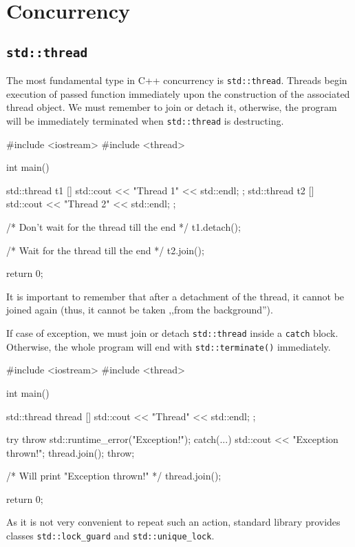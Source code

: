 \documentclass[../main]{subfiles}
\begin{document}
\chapter{Concurrency}
\section{\texttt{std::thread}}
    The most fundamental type in C++ concurrency is \texttt{std::thread}. Threads begin execution of passed function immediately
upon the construction of the associated thread object. We must remember to join or detach it, otherwise, the program
will be immediately terminated when \texttt{std::thread} is destructing.
\begin{Code}
    #include <iostream>
    #include <thread>

    int main()
    {
        std::thread t1 { [] { std::cout << "Thread 1" << std::endl; } };
        std::thread t2 { [] { std::cout << "Thread 2" << std::endl; } };

        /* Don't wait for the thread till the end */
        t1.detach();

        /* Wait for the thread till the end */
        t2.join();

        return 0;
    }
\end{Code}
\noindent
It is important to remember that after a detachment of the thread, it cannot be joined again (thus, it cannot be taken ,,from the background'').\newline

    If case of exception, we must join or detach \texttt{std::thread} inside a \texttt{catch} block. Otherwise, the whole program
will end with \texttt{std::terminate()} immediately.

\begin{Code}
    #include <iostream>
    #include <thread>

    int main()
    {
        std::thread thread { [] { std::cout << "Thread" << std::endl; }};

        try
        {
           throw std::runtime_error("Exception!");
        }
        catch(...)
        {
            std::cout << "Exception thrown!";
            thread.join();
            throw;
        }

        /* Will print "Exception thrown!" */
        thread.join();

        return 0;
    }
\end{Code}
\noindent
As it is not very convenient to repeat such an action, standard
library provides classes \texttt{std::lock\_guard} and
\texttt{std::unique\_lock}.
\end{document}
